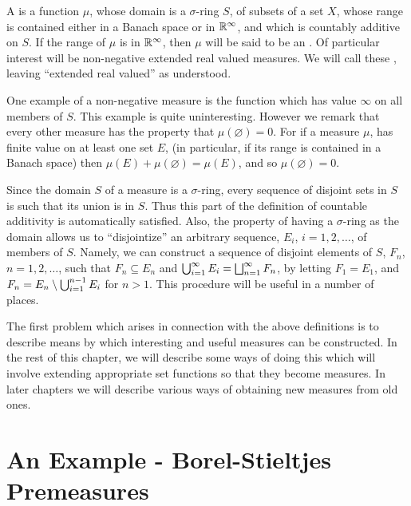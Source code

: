 \begin{definition}
A  is a function $\mu$, whose domain is a $\sigma$-ring $S$, of subsets of a set $X$, whose range is contained either in a Banach space or in $\mathbb{R}^\infty$, and which is countably additive on $S$. If the range of $\mu$ is in $\mathbb{R}^\infty$, then $\mu$ will be said to be an . Of particular interest will be non-negative extended real valued measures. We will call these , leaving ``extended real valued'' as understood.
\end{definition}

One example of a non-negative measure is the function which has value $\infty$ on all members of $S$. This example is quite uninteresting. However we remark that every other measure has the property that $\mu(\varnothing)=0$. For if a measure $\mu$, has finite value on at least one set $E$, (in particular, if its range is contained in a Banach space) then $\mu(E)+\mu(\varnothing)=\mu(E)$, and so $\mu(\varnothing)=0$.

Since the domain $S$ of a measure is a $\sigma$-ring, every sequence of disjoint sets in $S$ is such that its union is in $S$. Thus this part of the definition of countable additivity is automatically satisfied. Also, the property of having a $\sigma$-ring as the domain allows us to ``disjointize'' an arbitrary sequence, $E_i$, $i = 1, 2,\dots$, of members of $S$. Namely, we can construct a sequence of disjoint elements of $S$, $F_n$, $n = 1, 2,\dots$, such that $F_n\subseteq E_n$ and $\bigcup_{i=1}^\infty E_i=\bigsqcup_{n=1}^\infty F_n$, by letting $F_1 = E_1$, and $F_n=E_n\setminus\bigcup_{i=1}^{n-1}E_i$ for $n > 1$. This procedure will be useful in a number of places.

The first problem which arises in connection with the above definitions is to describe means by which interesting and useful measures can be constructed. In the rest of this chapter, we will describe some ways of doing this which will involve extending appropriate set functions so that they become measures. In later chapters we will describe various ways of obtaining new measures from old ones.


\section{An Example - Borel-Stieltjes Premeasures}

